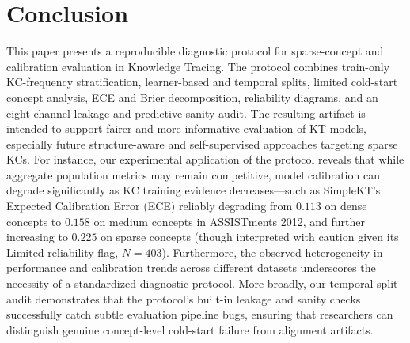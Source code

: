 \section{Conclusion}
\label{sec:conclusion}
This paper presents a reproducible diagnostic protocol for sparse-concept and calibration evaluation in Knowledge Tracing. The protocol combines train-only KC-frequency stratification, learner-based and temporal splits, limited cold-start concept analysis, ECE and Brier decomposition, reliability diagrams, and an eight-channel leakage and predictive sanity audit. The resulting artifact is intended to support fairer and more informative evaluation of KT models, especially future structure-aware and self-supervised approaches targeting sparse KCs. For instance, our experimental application of the protocol reveals that while aggregate population metrics may remain competitive, model calibration can degrade significantly as KC training evidence decreases---such as SimpleKT's Expected Calibration Error (ECE) reliably degrading from $0.113$ on dense concepts to $0.158$ on medium concepts in ASSISTments 2012, and further increasing to $0.225$ on sparse concepts (though interpreted with caution given its Limited reliability flag, $N=403$). Furthermore, the observed heterogeneity in performance and calibration trends across different datasets underscores the necessity of a standardized diagnostic protocol. More broadly, our temporal-split audit demonstrates that the protocol's built-in leakage and sanity checks successfully catch subtle evaluation pipeline bugs, ensuring that researchers can distinguish genuine concept-level cold-start failure from alignment artifacts.
